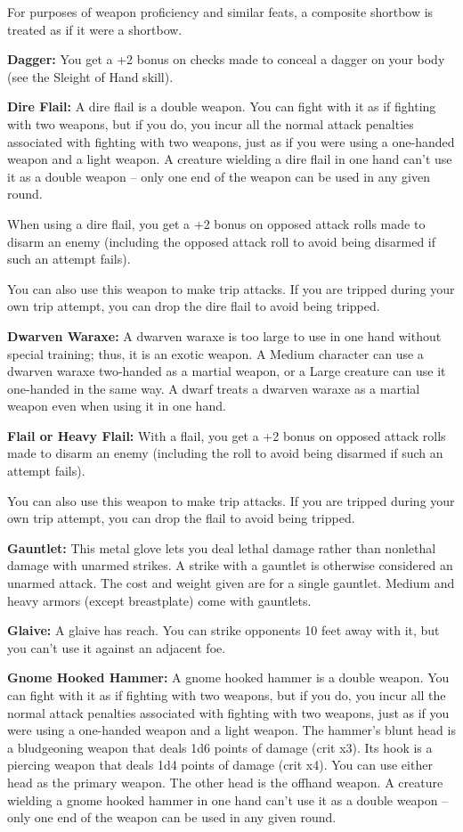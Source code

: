 \begin{multicols}{2}
For purposes of weapon proficiency and similar feats, a composite shortbow is treated as if it were a shortbow.

\textbf{Dagger:} You get a +2 bonus on  checks made to conceal a dagger on your body (see the Sleight of Hand skill).

\textbf{Dire Flail:} A dire flail is a double weapon. You can fight with it as if fighting with two weapons, but if you do, you incur all the normal attack penalties associated with fighting with two weapons, just as if you were using a one-handed weapon and a light weapon. A creature wielding a dire flail in one hand can't use it as a double weapon --  only one end of the weapon can be used in any given round.

When using a dire flail, you get a +2 bonus on opposed attack rolls made to disarm an enemy (including the opposed attack roll to avoid being disarmed if such an attempt fails).

You can also use this weapon to make trip attacks. If you are tripped during your own trip attempt, you can drop the dire flail to avoid being tripped.

\textbf{Dwarven Waraxe:} A dwarven waraxe is too large to use in one hand without special training; thus, it is an exotic weapon. A Medium character can use a dwarven waraxe two-handed as a martial weapon, or a Large creature can use it one-handed in the same way. A dwarf treats a dwarven waraxe as a martial weapon even when using it in one hand.

\textbf{Flail or Heavy Flail:} With a flail, you get a +2 bonus on opposed attack rolls made to disarm an enemy (including the roll to avoid being disarmed if such an attempt fails).

You can also use this weapon to make trip attacks. If you are tripped during your own trip attempt, you can drop the flail to avoid being tripped.

\textbf{Gauntlet:} This metal glove lets you deal lethal damage rather than nonlethal damage with unarmed strikes. A strike with a gauntlet is otherwise considered an unarmed attack. The cost and weight given are for a single gauntlet. Medium and heavy armors (except breastplate) come with gauntlets.

\textbf{Glaive:} A glaive has reach. You can strike opponents 10 feet away with it, but you can't use it against an adjacent foe.

\textbf{Gnome Hooked Hammer:} A gnome hooked hammer is a double weapon. You can fight with it as if fighting with two weapons, but if you do, you incur all the normal attack penalties associated with fighting with two weapons, just as if you were using a one-handed weapon and a light weapon. The hammer's blunt head is a bludgeoning weapon that deals 1d6 points of damage (crit x3). Its hook is a piercing weapon that deals 1d4 points of damage (crit x4). You can use either head as the primary weapon. The other head is the offhand weapon. A creature wielding a gnome hooked hammer in one hand can't use it as a double weapon -- only one end of the weapon can be used in any given round.


\end{multicols}

